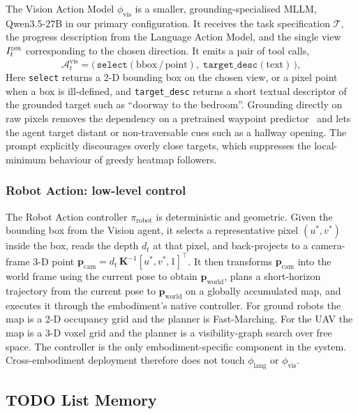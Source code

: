 \documentclass[conference]{IEEEtran}
\begin{document}
The Vision Action Model $\phi_{\mathrm{vis}}$ is a smaller,
grounding-specialised MLLM, Qwen3.5-27B in our primary configuration. It
receives the task specification $\mathcal{T}$, the progress description from
the Language Action Model, and the single view $I^{\textsc{dir}}_t$
corresponding to the chosen direction. It emits a pair of tool calls,
\begin{equation}
\mathcal{A}^{\mathrm{vis}}_t = \big(\,
\texttt{select}(\mathrm{bbox}\,/\,\mathrm{point}),\;
\texttt{target\_desc}(\mathrm{text})\,\big),
\end{equation}
Here \texttt{select} returns a 2-D bounding box on the chosen view, or a pixel
point when a box is ill-defined, and \texttt{target\_desc} returns a short
textual descriptor of the grounded target such as ``doorway to the bedroom''.
Grounding directly on raw pixels removes the dependency on a pretrained
waypoint predictor~\cite{yokoyama2024vlfm} and lets the agent target distant
or non-traversable cues such as a hallway opening. The prompt explicitly
discourages overly close targets, which suppresses the local-minimum behaviour
of greedy heatmap followers.

\subsubsection{Robot Action: low-level control}

The Robot Action controller $\pi_{\mathrm{robot}}$ is deterministic and
geometric. Given the bounding box from the Vision agent, it selects a
representative pixel $(u^*, v^*)$ inside the box, reads the depth $d_t$ at
that pixel, and back-projects to a camera-frame 3-D point
$\mathbf{p}_{\mathrm{cam}} = d_t\,\mathbf{K}^{-1}[u^*, v^*, 1]^{\top}$. It
then transforms $\mathbf{p}_{\mathrm{cam}}$ into the world frame using the
current pose to obtain $\mathbf{p}_{\mathrm{world}}$, plans a short-horizon
trajectory from the current pose to $\mathbf{p}_{\mathrm{world}}$ on a
globally accumulated map, and executes it through the embodiment's native
controller. For ground robots the map is a 2-D occupancy grid and the planner
is Fast-Marching. For the UAV the map is a 3-D voxel grid and the planner is a
visibility-graph search over free space. The controller is the only
embodiment-specific component in the system. Cross-embodiment deployment
therefore does not touch $\phi_{\mathrm{lang}}$ or $\phi_{\mathrm{vis}}$.

\subsection{TODO List Memory}
\label{subsec:tdm}
\end{document}

